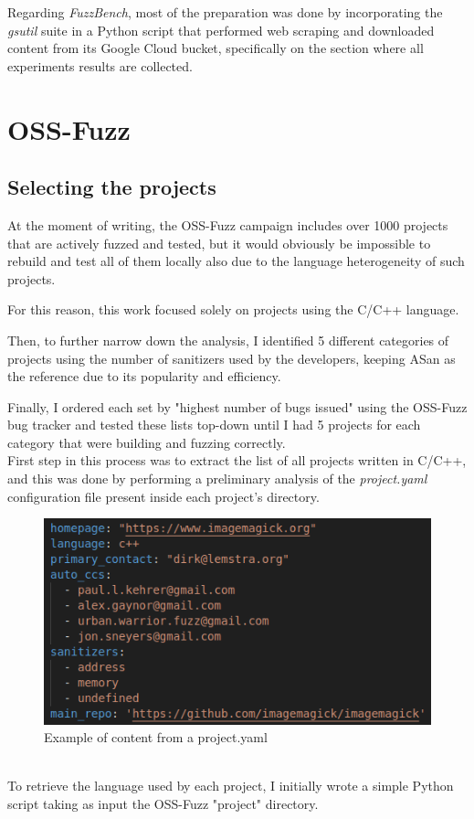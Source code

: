 Regarding \textit{FuzzBench}, most of the preparation was done by incorporating the \textit{gsutil} suite in a Python script that performed web scraping and downloaded content from its Google Cloud bucket, specifically on the section where all experiments results are collected.


\newpage
\section{OSS-Fuzz}
\subsection{Selecting the projects} \label{selection}
At the moment of writing, the OSS-Fuzz campaign includes over 1000 projects that are actively fuzzed and tested, but it would obviously be impossible to rebuild and test all of them locally also due to the language heterogeneity of such projects.

For this reason, this work focused solely on projects using the C/C++ language.

Then, to further narrow down the analysis, I identified 5 different categories of projects using the number of sanitizers used by the developers, keeping ASan as the reference due to its popularity and efficiency.

Finally, I ordered each set by "highest number of bugs issued" using the OSS-Fuzz bug tracker and tested these lists top-down until I had 5 projects for each category that were building and fuzzing correctly.
\ \\ 
 

First step in this process was to extract the list of all projects written in C/C++, and this was done by performing a preliminary analysis of the \textit{project.yaml} configuration file present inside each project's directory.
\newline
\begin{figure}[h]
\centering
\includegraphics[scale=0.65]{foto/project_yaml.png}
\caption{Example of content from a project.yaml}
\label{fig:project_yaml}
\end{figure}
\ \\
To retrieve the language used by each project, I initially wrote a simple Python script taking as input the OSS-Fuzz "project" directory.

